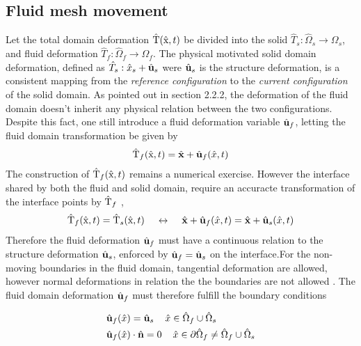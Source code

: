 \subsection{Fluid mesh movement}
 Let the total domain deformation $\text{\^{T}}(\text{\^{x}}, t)$ be divided into the solid  $\hat{T}_s: \hat{\Omega}_s \rightarrow \Omega_s$, and fluid deformation $\hat{T}_f: \hat{\Omega}_f \rightarrow \Omega_f$. The physical motivated solid domain deformation, defined as $\hat{T}_s: \hat{x}_s + \hat{\mathbf{u}}_s$ were $\hat{\mathbf{u}}_s$ is the structure deformation, is 
a consistent mapping from the \textit{reference configuration} to the \textit{current configuration} of the solid domain. As pointed out in section 2.2.2, the deformation of the fluid domain doesn't inherit any physical relation between the two configurations. Despite this fact, one still introduce a fluid deformation variable $\hat{\mathbf{u}}_f$, letting the fluid domain transformation be given by 
\begin{align*}
\text{\^{T}}_f(\text{\^{x}}, t) = \hat{\mathbf{x}} + \hat{\mathbf{u}}_f(\hat{x}, t)
\end{align*}
The construction of $\text{\^{T}}_f(\text{\^{x}}, t) $ remains a numerical exercise. However the interface shared by both the fluid and solid domain, require an accuracte transformation of the interface points by $\text{\^{T}}_f$ \cite{Richter2016}, 
\begin{align*}
\text{\^{T}}_f(\text{\^{x}}, t) = \text{\^{T}}_s(\text{\^{x}}, t) \hspace{4mm}  \leftrightarrow  
\hspace{4mm}\hat{\mathbf{x}} + \hat{\mathbf{u}}_f(\hat{x}, t) =  \hat{\mathbf{x}} + \hat{\mathbf{u}}_s(\hat{x}, t)
\end{align*}
Therefore the fluid deformation $\hat{\mathbf{u}}_f$ must have a continuous relation to the structure deformation $\hat{\mathbf{u}}_s$, enforced by $\hat{\mathbf{u}}_f = \hat{\mathbf{u}}_s$ on the interface.For the non-moving boundaries in the fluid domain, tangential deformation are allowed, however normal deformations in relation the the boundaries are not allowed \cite{Richter2010c}. The fluid domain deformation $\hat{\mathbf{u}}_f$ must therefore fulfill the boundary conditions 

\begin{align}
&\hat{\mathbf{u}}_f(\hat{x}) = \hat{\mathbf{u}}_s \hspace{4mm} \hat{x} \in \hat{\Omega}_f \cup  \hat{\Omega}_s \\
&\hat{\mathbf{u}}_f(\hat{x}) \cdot \hat{\mathbf{n}} = 0  \hspace{4mm}  \hat{x} \in \partial \hat{\Omega}_f \neq \hat{\Omega}_f \cup  \hat{\Omega}_s
\end{align} 

